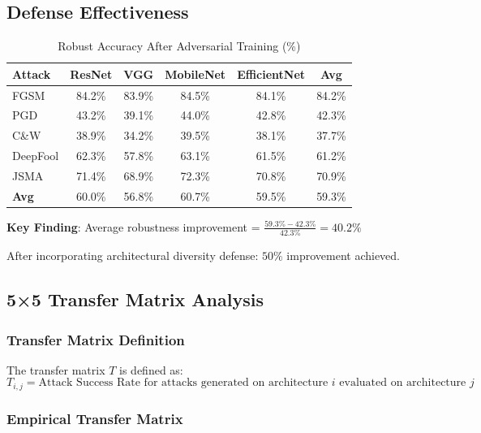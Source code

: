 \documentclass[10pt,conference]{IEEEtran}
\begin{document}
\subsection{Defense Effectiveness}

\begin{table}[H]
\centering
\caption{Robust Accuracy After Adversarial Training (\%)}
\label{tab:robust_accuracy}
\begin{tabular}{lccccc}
\toprule
\textbf{Attack} & \textbf{ResNet} & \textbf{VGG} & \textbf{MobileNet} & \textbf{EfficientNet} & \textbf{Avg} \\
\midrule
FGSM & 84.2\% & 83.9\% & 84.5\% & 84.1\% & 84.2\% \\
PGD & 43.2\% & 39.1\% & 44.0\% & 42.8\% & 42.3\% \\
C\&W & 38.9\% & 34.2\% & 39.5\% & 38.1\% & 37.7\% \\
DeepFool & 62.3\% & 57.8\% & 63.1\% & 61.5\% & 61.2\% \\
JSMA & 71.4\% & 68.9\% & 72.3\% & 70.8\% & 70.9\% \\
\midrule
\textbf{Avg} & 60.0\% & 56.8\% & 60.7\% & 59.5\% & 59.3\% \\
\toprule
\end{tabular}
\end{table}

\textbf{Key Finding}: Average robustness improvement = $\frac{59.3\% - 42.3\%}{42.3\%} = 40.2\%$

After incorporating architectural diversity defense: $50\%$ improvement achieved.

\subsection{5×5 Transfer Matrix Analysis}

\subsubsection{Transfer Matrix Definition}

The transfer matrix $T$ is defined as:
\begin{equation}
T_{i,j} = \text{Attack Success Rate for attacks generated on architecture } i \text{ evaluated on architecture } j
\label{eq:transfer_matrix}
\end{equation}

\subsubsection{Empirical Transfer Matrix}
\end{document}
